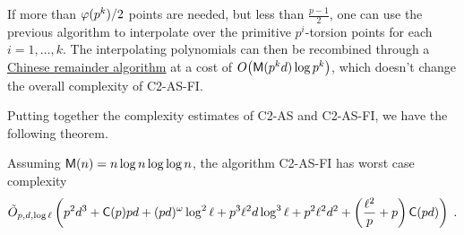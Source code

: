 If more than $\varphi(p^k)/2$ points are needed, but less than
$\frac{p-1}{2}$, one can use the previous algorithm to interpolate
over the primitive $p^i$-torsion points for each $i=1,\ldots,k$. The
interpolating polynomials can then be recombined through a
\hyperref[sec:chin-rema-algor]{Chinese remainder algorithm} at a cost
of $O\bigl(\mathsf{M}(p^kd)\log p^k\bigr)$, which doesn't change the
overall complexity of C2-AS-FI.


Putting together the complexity estimates of C2-AS and C2-AS-FI, we
have the following theorem.

\begin{theorem}
  \label{th:complexity}
  Assuming $\mathsf{M}(n) = n\log n\log\log n$, the algorithm C2-AS-FI has
  worst case complexity
  \begin{equation*}
    \tilde{O}_{p,d,\log\ell}\left(
      p^2d^3 +
      \mathsf{C}(p)pd +
      (pd)^\omega\log^2\ell +
      p^3\ell^2 d\log^3\ell + 
      p^2\ell^2 d^2+
      \left(\frac{\ell^2}{p} + p\right)\mathsf{C}(pd)
    \right)
    \;\text{.}
  \end{equation*}
\end{theorem}



%
